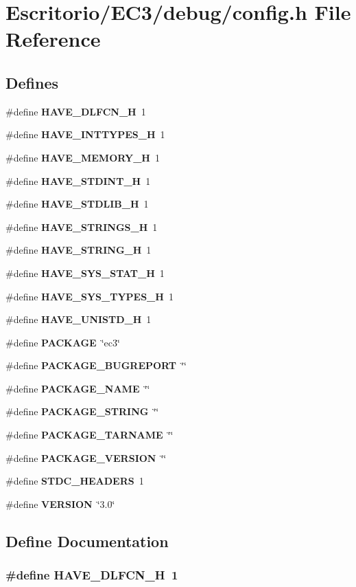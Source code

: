 \section{Escritorio/EC3/debug/config.h File Reference}
\label{config_8h}
\subsection*{Defines}
\begin{CompactItemize}
\item 
\#define {\bf HAVE\_\-DLFCN\_\-H}~1
\item 
\#define {\bf HAVE\_\-INTTYPES\_\-H}~1
\item 
\#define {\bf HAVE\_\-MEMORY\_\-H}~1
\item 
\#define {\bf HAVE\_\-STDINT\_\-H}~1
\item 
\#define {\bf HAVE\_\-STDLIB\_\-H}~1
\item 
\#define {\bf HAVE\_\-STRINGS\_\-H}~1
\item 
\#define {\bf HAVE\_\-STRING\_\-H}~1
\item 
\#define {\bf HAVE\_\-SYS\_\-STAT\_\-H}~1
\item 
\#define {\bf HAVE\_\-SYS\_\-TYPES\_\-H}~1
\item 
\#define {\bf HAVE\_\-UNISTD\_\-H}~1
\item 
\#define {\bf PACKAGE}~\char`\"{}ec3\char`\"{}
\item 
\#define {\bf PACKAGE\_\-BUGREPORT}~\char`\"{}\char`\"{}
\item 
\#define {\bf PACKAGE\_\-NAME}~\char`\"{}\char`\"{}
\item 
\#define {\bf PACKAGE\_\-STRING}~\char`\"{}\char`\"{}
\item 
\#define {\bf PACKAGE\_\-TARNAME}~\char`\"{}\char`\"{}
\item 
\#define {\bf PACKAGE\_\-VERSION}~\char`\"{}\char`\"{}
\item 
\#define {\bf STDC\_\-HEADERS}~1
\item 
\#define {\bf VERSION}~\char`\"{}3.0\char`\"{}
\end{CompactItemize}


\subsection{Define Documentation}
\subsubsection{\setlength{\rightskip}{0pt plus 5cm}\#define HAVE\_\-DLFCN\_\-H~1}\label{config_8h_49b3130cc8dea3dc4eb5d7a932627831}


